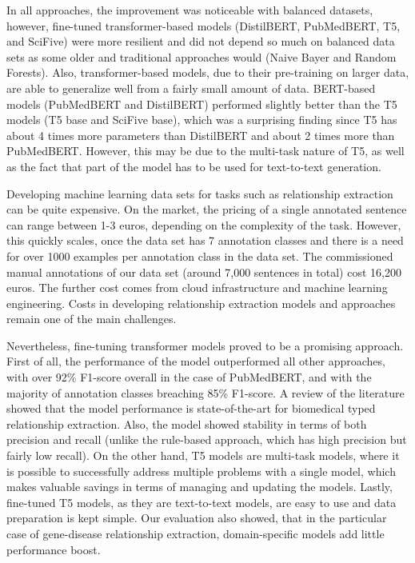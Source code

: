 \documentclass[final,12pt,3p,times,twocolumn,authoryear]{elsarticle}
\begin{document}
In all approaches, the improvement was noticeable with balanced datasets, however, fine-tuned transformer-based models (DistilBERT, PubMedBERT, T5, and SciFive) were more resilient and did not depend so much on balanced data sets as some older and traditional approaches would (Naive Bayer and Random Forests). Also, transformer-based models, due to their pre-training on larger data, are able to generalize well from a fairly small amount of data. BERT-based models (PubMedBERT and DistilBERT) performed slightly better than the T5 models (T5 base and SciFive base), which was a surprising finding since T5  has about 4 times more parameters than DistilBERT and about 2 times more than PubMedBERT. However, this may be due to the multi-task nature of T5, as well as the fact that part of the model has to be used for text-to-text generation.

Developing machine learning data sets for tasks such as relationship extraction can be quite expensive. On the market, the pricing of a single annotated sentence can range between 1-3 euros, depending on the complexity of the task. However, this quickly scales, once the data set has 7 annotation classes and there is a need for over 1000 examples per annotation class in the data set. The commissioned manual annotations of our data set (around 7,000 sentences in total) cost 16,200 euros. The further cost comes from cloud infrastructure and machine learning engineering. Costs in developing relationship extraction models and approaches remain one of the main challenges.

Nevertheless, fine-tuning transformer models proved to be a promising approach. First of all, the performance of the model outperformed all other approaches, with over 92\% F1-score overall in the case of PubMedBERT, and with the majority of annotation classes breaching 85\% F1-score. A review of the literature showed that the model performance is state-of-the-art for biomedical typed relationship extraction. Also, the model showed stability in terms of both precision and recall (unlike the rule-based approach, which has high precision but fairly low recall). On the other hand, T5 models are multi-task models, where it is possible to successfully address multiple problems with a single model, which makes valuable savings in terms of managing and updating the models. Lastly, fine-tuned T5 models, as they are text-to-text models, are easy to use and data preparation is kept simple. Our evaluation also showed, that in the particular case of gene-disease relationship extraction, domain-specific models add little performance boost.  
\end{document}
